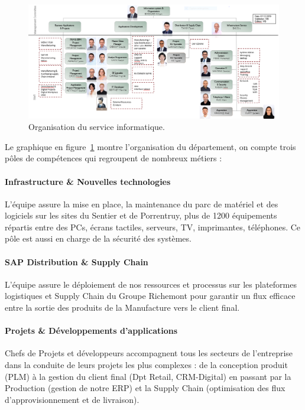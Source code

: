 \begin{figure}[ht]
    \centering
    \includegraphics[width=\textwidth]{images/organisation.PNG}
    \caption{Organisation du service informatique.}
    \label{fig:organisation}
\end{figure}

Le graphique en figure~\ref{fig:organisation} montre l'organisation du département, on compte trois pôles de compétences qui regroupent de nombreux métiers :

\paragraph{Infrastructure \& Nouvelles technologies}L’équipe assure la mise en place, la maintenance du parc de matériel et des logiciels sur les sites du Sentier et de Porrentruy, plus de 1200 équipements répartis entre des PCs, écrans tactiles, serveurs, TV, imprimantes, téléphones. Ce pôle est aussi en charge de la sécurité des systèmes.

\paragraph{SAP Distribution \& Supply Chain}L’équipe assure le déploiement de nos ressources et processus sur les plateformes logistiques et Supply Chain du Groupe Richemont pour garantir un flux efficace entre la sortie des produits de la Manufacture vers le client final.

\paragraph{Projets \& Développements d’applications}Chefs de Projets et développeurs accompagnent tous les secteurs de l’entreprise dans la conduite de leurs projets les plus complexes : de la conception produit (PLM) à la gestion du client final (Dpt Retail, CRM-Digital) en passant par la Production (gestion de notre ERP) et la Supply Chain (optimisation des flux d’approvisionnement et de livraison).
